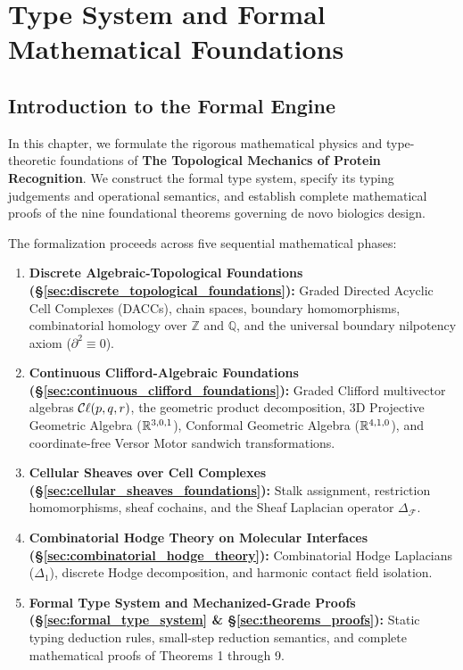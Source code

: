 \chapter{Type System and Formal Mathematical Foundations}
\label{ch:type_system}

\section{Introduction to the Formal Engine}
\label{sec:formal_engine_intro}

In this chapter, we formulate the rigorous mathematical physics and type-theoretic foundations of \textbf{The Topological Mechanics of Protein Recognition}. We construct the formal type system, specify its typing judgements and operational semantics, and establish complete mathematical proofs of the nine foundational theorems governing de novo biologics design.

The formalization proceeds across five sequential mathematical phases:
\begin{enumerate}[leftmargin=1.5cm]
    \item \textbf{Discrete Algebraic-Topological Foundations (§\ref{sec:discrete_topological_foundations}):} Graded Directed Acyclic Cell Complexes (DACCs), chain spaces, boundary homomorphisms, combinatorial homology over $\mathbb{Z}$ and $\mathbb{Q}$, and the universal boundary nilpotency axiom ($\partial^2 \equiv 0$).
    \item \textbf{Continuous Clifford-Algebraic Foundations (§\ref{sec:continuous_clifford_foundations}):} Graded Clifford multivector algebras $\mathcal{C}\ell(p,q,r)$, the geometric product decomposition, 3D Projective Geometric Algebra ($\mathbb{R}^{3,0,1}$), Conformal Geometric Algebra ($\mathbb{R}^{4,1,0}$), and coordinate-free Versor Motor sandwich transformations.
    \item \textbf{Cellular Sheaves over Cell Complexes (§\ref{sec:cellular_sheaves_foundations}):} Stalk assignment, restriction homomorphisms, sheaf cochains, and the Sheaf Laplacian operator $\Delta_{\mathcal{F}}$.
    \item \textbf{Combinatorial Hodge Theory on Molecular Interfaces (§\ref{sec:combinatorial_hodge_theory}):} Combinatorial Hodge Laplacians ($\Delta_1$), discrete Hodge decomposition, and harmonic contact field isolation.
    \item \textbf{Formal Type System and Mechanized-Grade Proofs (§\ref{sec:formal_type_system} \& §\ref{sec:theorems_proofs}):} Static typing deduction rules, small-step reduction semantics, and complete mathematical proofs of Theorems 1 through 9.
\end{enumerate}

